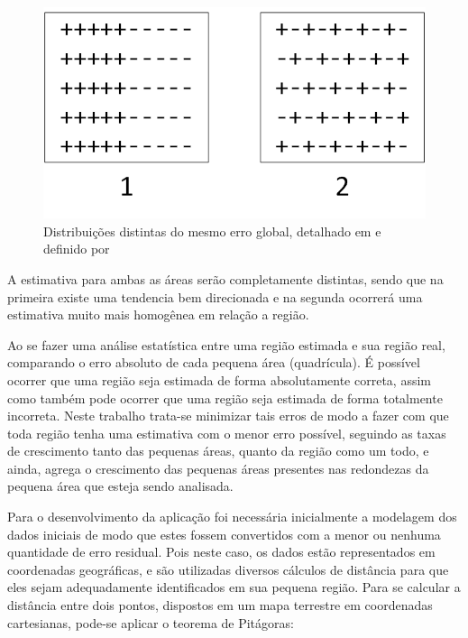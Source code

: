 \begin{figure}[h]
	\centering	
	\includegraphics[scale=2]{Figuras/Ilustration-ErrorDistArango.png}
	\caption{Distribuições distintas do mesmo erro global, detalhado em \cite{arango2000thesis} e definido por \cite{willis1995spatial}}
	\label{fig:ErrorDistArango}
\end{figure}

A estimativa para ambas as áreas serão completamente distintas, sendo que na primeira existe uma tendencia bem direcionada e na segunda ocorrerá uma estimativa muito mais homogênea em relação a região. 

Ao se fazer uma análise estatística entre uma região estimada e sua região real, comparando o erro absoluto de cada pequena área (quadrícula). É possível ocorrer que uma região seja estimada de forma absolutamente correta, assim como também pode ocorrer que uma região seja estimada de forma totalmente incorreta. Neste trabalho trata-se minimizar tais erros de modo a fazer com que toda região tenha uma estimativa com o menor erro possível, seguindo as taxas de crescimento tanto das pequenas áreas, quanto da região como um todo, e ainda, agrega o crescimento das pequenas áreas presentes nas redondezas da pequena área que esteja sendo analisada.

Para o desenvolvimento da aplicação foi necessária inicialmente a modelagem dos dados iniciais de modo que estes fossem convertidos com a menor ou nenhuma quantidade de erro residual. Pois neste caso, os dados estão representados em coordenadas geográficas, e são utilizadas diversos cálculos de distância para que eles sejam adequadamente identificados em sua pequena região. Para se calcular a distância entre dois pontos, dispostos em um mapa terrestre em coordenadas cartesianas, pode-se aplicar o teorema de Pitágoras:

